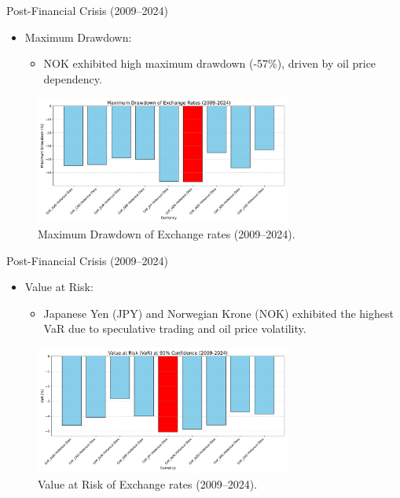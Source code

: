 \documentclass{beamer}
\begin{document}
\begin{frame}{Post-Financial Crisis (2009--2024)}
  \begin{itemize}
    \item Maximum Drawdown:
    \begin{itemize}
      \item NOK exhibited high maximum drawdown (-57\%), driven by oil price dependency.
    \end{itemize}
   \end{itemize}

   \begin{figure}[h!]
    \centering
    \includegraphics[width=0.75\textwidth]{../../images/maximum_drawdown_2009_2024.pdf}
    \caption{Maximum Drawdown of Exchange rates (2009--2024).}
    \label{fig:maximum_drawdown_2009_2024}
\end{figure}
    
\end{frame}

\begin{frame}{Post-Financial Crisis (2009--2024)}
  \begin{itemize}
    \item Value at Risk:
    \begin{itemize}
      \item Japanese Yen (JPY) and Norwegian Krone (NOK) exhibited the highest VaR due to speculative trading and oil price volatility.
    \end{itemize}
   \end{itemize}

   \begin{figure}[h!]
    \centering
    \includegraphics[width=0.75\textwidth]{../../images/var_2009_2024.pdf}
    \caption{Value at Risk of Exchange rates (2009--2024).}
    \label{fig:var_2009_2024}
\end{figure}
    
\end{frame}
\end{document}
